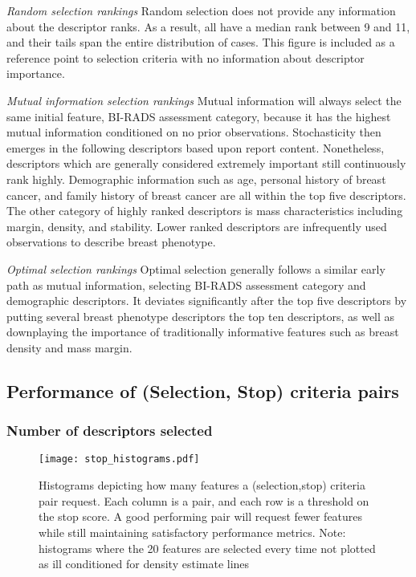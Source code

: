 \emph{Random selection rankings}
Random selection does not provide any information about the descriptor ranks. As a result, all have a median rank between 9 and 11, and their tails span the entire distribution of cases. This figure is included as a reference point to selection criteria with no information about descriptor importance.

\emph{Mutual information selection rankings}
Mutual information will always select the same initial feature, BI-RADS assessment category, because it has the highest mutual information conditioned on no prior observations. Stochasticity then emerges in the following descriptors based upon report content. Nonetheless, descriptors which are generally considered extremely important still continuously rank highly. Demographic information such as age, personal history of breast cancer, and family history of breast cancer are all within the top five descriptors. The other category of highly ranked descriptors is mass characteristics including margin, density, and stability. Lower ranked descriptors are infrequently used observations to describe breast phenotype.

\emph{Optimal selection rankings}
Optimal selection generally follows a similar early path as mutual information, selecting BI-RADS assessment category and demographic descriptors. It deviates significantly after the top five descriptors by putting several breast phenotype descriptors the top ten descriptors, as well as downplaying the importance of traditionally informative features such as breast density and mass margin.

 
 
\subsection{Performance of (Selection, Stop) criteria pairs}

\subsubsection{Number of descriptors selected}

\begin{figure}[hb]
	\centering
	\texttt{[image: stop\_histograms.pdf]}
	\caption[Histograms of number of features selected for feedback]{Histograms depicting how many features a (selection,stop) criteria pair request. Each column is a pair, and each row is a threshold on the stop score. A good performing pair will request fewer features while still maintaining satisfactory performance metrics. Note: histograms where the 20 features are selected every time not plotted as ill conditioned for density estimate lines}
	\label{fig:feedback_stop_histograms}
\end{figure}

